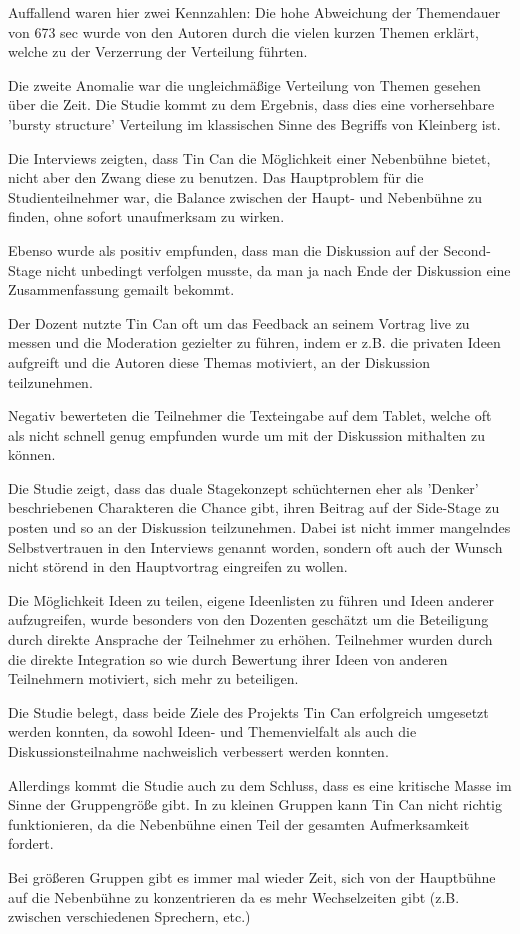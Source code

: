 Auffallend waren hier zwei Kennzahlen: Die hohe Abweichung der Themendauer von
673  sec wurde von den Autoren durch die vielen kurzen Themen erklärt, welche zu
der Verzerrung der Verteilung führten.

Die zweite Anomalie war die ungleichmäßige Verteilung von Themen gesehen über
die Zeit. Die Studie\cite{HarGorSch2012} kommt zu dem Ergebnis, dass dies eine vorhersehbare 'bursty
structure' Verteilung im klassischen Sinne des Begriffs von Kleinberg
\cite{Klei2003} ist.

Die Interviews zeigten, dass Tin Can die Möglichkeit einer Nebenbühne bietet,
nicht aber den Zwang diese zu benutzen. Das Hauptproblem für die
Studienteilnehmer war, die Balance zwischen der Haupt- und Nebenbühne zu finden,
ohne sofort unaufmerksam zu wirken.

Ebenso wurde als positiv empfunden, dass man die Diskussion auf der Second-Stage
nicht unbedingt verfolgen musste, da man ja nach Ende der Diskussion eine
Zusammenfassung gemailt bekommt.

Der Dozent nutzte Tin Can oft um das Feedback an seinem Vortrag live zu messen
und die Moderation gezielter zu führen, indem er z.B. die privaten Ideen
aufgreift und die Autoren diese Themas motiviert, an der Diskussion teilzunehmen.

Negativ bewerteten die Teilnehmer die Texteingabe auf dem Tablet, welche oft
als nicht schnell genug empfunden wurde um mit der Diskussion mithalten zu können.

Die Studie\cite{HarGorSch2012} zeigt, dass das duale Stagekonzept schüch\-ter\-nen eher als 'Denker'
beschriebenen Charakteren die Chance gibt, ihren Beitrag auf der Side-Stage zu
posten und so an der Diskussion teilzunehmen. Dabei ist nicht immer mangelndes
Selbstvertrauen in den Interviews genannt worden, sondern oft auch der Wunsch
nicht störend in den Hauptvortrag eingreifen zu wollen.

Die Möglichkeit Ideen zu teilen, eigene Ideenlisten zu füh\-ren und Ideen
anderer aufzugreifen, wurde besonders von den Dozenten geschätzt um die Beteiligung durch
direkte Ansprache der Teilnehmer zu erhöhen. Teilnehmer wurden durch die direkte
Integration so wie durch Bewertung ihrer Ideen von anderen Teilnehmern
motiviert, sich mehr zu beteiligen.

Die Studie\cite{HarGorSch2012} belegt, dass beide Ziele des Projekts Tin Can erfolgreich umgesetzt
werden konnten, da sowohl Ideen- und Themenvielfalt als auch die
Diskussionsteilnahme nachweislich verbessert werden konnten.

Allerdings kommt die Studie\cite{HarGorSch2012} auch zu dem Schluss, dass es eine kritische Masse im
Sinne der Gruppengröße gibt. In zu kleinen Gruppen kann Tin Can nicht richtig
funktionieren, da die Nebenbühne einen Teil der gesamten Aufmerksamkeit fordert.

Bei größeren Gruppen gibt es immer mal wieder Zeit, sich von der Hauptbühne auf
die Nebenbühne zu konzentrieren da es mehr Wechselzeiten gibt (z.B. zwischen
verschiedenen Sprechern, etc.)





